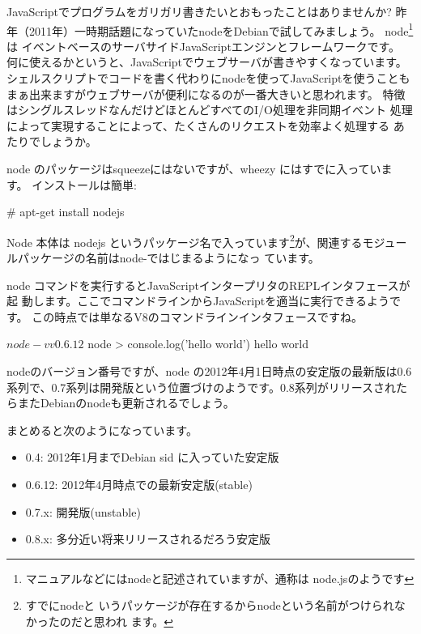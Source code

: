 \documentclass[mingoth,a4paper]{jsarticle}
\begin{document}

JavaScriptでプログラムをガリガリ書きたいとおもったことはありませんか?
昨年（2011年）一時期話題になっていたnodeをDebianで試してみましょう。
node\footnote{マニュアルなどにはnodeと記述されていますが、通称は
node.jsのようです}は
イベントベースのサーバサイドJavaScriptエンジンとフレームワークです。
何に使えるかというと、JavaScriptでウェブサーバが書きやすくなっています。
シェルスクリプトでコードを書く代わりにnodeを使ってJavaScriptを使うことも
まぁ出来ますがウェブサーバが便利になるのが一番大きいと思われます。
特徴はシングルスレッドなんだけどほとんどすべてのI/O処理を非同期イベント
処理によって実現することによって、たくさんのリクエストを効率よく処理する
あたりでしょうか。

node のパッケージはsqueezeにはないですが、wheezy にはすでに入っていま
す。
インストールは簡単:
\begin{commandline}
# apt-get install nodejs
\end{commandline}

Node 本体は nodejs というパッケージ名で入っています\footnote{すでにnodeと
いうパッケージが存在するからnodeという名前がつけられなかったのだと思われ
ます。}が、関連するモジュールパッケージの名前はnode-ではじまるようになっ
ています。

node コマンドを実行するとJavaScriptインタープリタのREPLインタフェースが起
動します。ここでコマンドラインからJavaScriptを適当に実行できるようです。
この時点では単なるV8のコマンドラインインタフェースですね。

\begin{commandline}
$ node -v 
v0.6.12
$ node
> console.log('hello world')
hello world
\end{commandline}

nodeのバージョン番号ですが、node の2012年4月1日時点の安定版の最新版は0.6
系列で、0.7系列は開発版という位置づけのようです。0.8系列がリリースされた
らまたDebianのnodeも更新されるでしょう。

まとめると次のようになっています。
\begin{itemize}
 \item 0.4: 2012年1月までDebian sid に入っていた安定版
 \item 0.6.12: 2012年4月時点での最新安定版(stable)
 \item 0.7.x: 開発版(unstable)
 \item 0.8.x: 多分近い将来リリースされるだろう安定版
\end{itemize}
\end{document}
